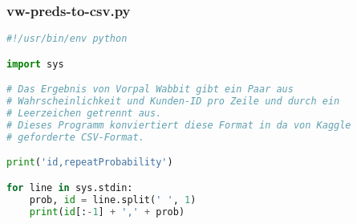 \subsubsection{vw-preds-to-csv.py}
\label{code:vw-preds-to-csv}
\begin{lstlisting}[language=Python]
#!/usr/bin/env python

import sys

# Das Ergebnis von Vorpal Wabbit gibt ein Paar aus 
# Wahrscheinlichkeit und Kunden-ID pro Zeile und durch ein
# Leerzeichen getrennt aus.
# Dieses Programm konviertiert diese Format in da von Kaggle
# geforderte CSV-Format.

print('id,repeatProbability')

for line in sys.stdin:
	prob, id = line.split(' ', 1)
	print(id[:-1] + ',' + prob)
\end{lstlisting}
	
	